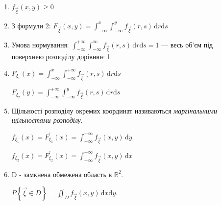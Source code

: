\begin{enumerate}
    \item $f_{\vec{\xi}}(x, y) \geq 0$
    \item З формули 2: $F_{\vec{\xi}}(x, y) 
    = \int_{-\infty}^x \int_{-\infty}^y f_{\vec{\xi}}(r, s) 
    \,\mathrm{d}r \mathrm{d}s $
    \item Умова нормування: 
    $\int_{-\infty}^{+\infty} \int_{-\infty}^{\infty} f_{\vec{\xi}}(r, s) 
    \,\mathrm{d}r \mathrm{d}s = 1$ --- весь об'єм під поверхнею розподілу 
    дорівнює 1.
    \item $F_{\xi_1}(x) = \int_{-\infty}^{x} \int_{-\infty}^{+\infty} 
    f_{\vec{\xi}}(r, s) \,\mathrm{d}r \mathrm{d}s$

    $F_{\xi_2}(y) = \int_{-\infty}^{+\infty} \int_{-\infty}^{y} 
    f_{\vec{\xi}}(r, s) \,\mathrm{d}r \mathrm{d}s$
    \item Щільності розподілу окремих координат називаються 
    \emph{маргінальними щільностями розподілу}.

    $f_{\xi_1}(x) = F^{'}_{\xi_1}(x) 
    = \int_{-\infty}^{+\infty} f_{\vec{\xi}}(x, y) \,\mathrm{d}y $

    $f_{\xi_2}(x) = F^{'}_{\xi_2}(x) 
    = \int_{-\infty}^{+\infty} f_{\vec{\xi}}(x, y) \,\mathrm{d}x $
    
    \item D - замкнена обмежена область в $\mathbb{R}^2$.
    
    $P\left\{ \vec{\xi} \in D \right\} = \iint_D f_{\vec{\xi}}(x, y) \,
    \mathrm{d}x \mathrm{d}y$.
\end{enumerate}

